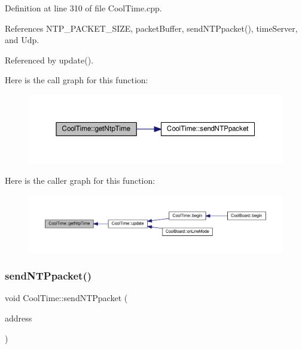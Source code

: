 Definition at line 310 of file Cool\+Time.\+cpp.



References N\+T\+P\+\_\+\+P\+A\+C\+K\+E\+T\+\_\+\+S\+I\+ZE, packet\+Buffer, send\+N\+T\+Ppacket(), time\+Server, and Udp.



Referenced by update().

Here is the call graph for this function\+:
\nopagebreak
\begin{figure}[H]
\begin{center}
\leavevmode
\includegraphics[width=350pt]{d6/d49/class_cool_time_a41fbbbfd651c2079f54d4b2911e4c705_cgraph}
\end{center}
\end{figure}
Here is the caller graph for this function\+:
\nopagebreak
\begin{figure}[H]
\begin{center}
\leavevmode
\includegraphics[width=350pt]{d6/d49/class_cool_time_a41fbbbfd651c2079f54d4b2911e4c705_icgraph}
\end{center}
\end{figure}
\mbox{\label{class_cool_time_a236a38d120dc53bc67456d763838c5a1}} 
\subsubsection{\texorpdfstring{send\+N\+T\+Ppacket()}{sendNTPpacket()}}
{\footnotesize\ttfamily void Cool\+Time\+::send\+N\+T\+Ppacket (\begin{DoxyParamCaption}\item[{I\+P\+Address \&}]{address }\end{DoxyParamCaption})}

